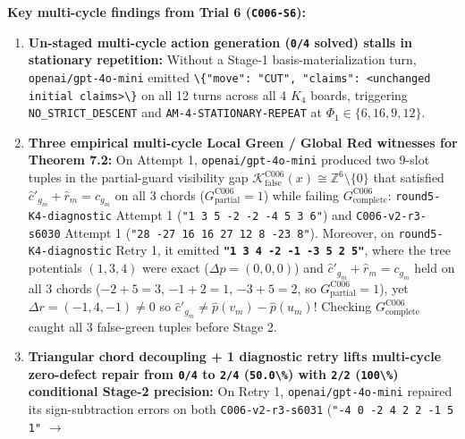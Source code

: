 \documentclass[
  11pt,
]{article}
\newcommand{\passthrough}[1]{#1}
\providecommand{\tightlist}{%
  \setlength{\itemsep}{0pt}\setlength{\parskip}{0pt}}
\begin{document}
\textbf{Key multi-cycle findings from Trial 6
(\passthrough{\lstinline!C006-S6!}):}

\begin{enumerate}
\def\labelenumi{\arabic{enumi}.}
\tightlist
\item
  \textbf{Un-staged multi-cycle action generation
  (\passthrough{\lstinline!0/4!} solved) stalls in stationary
  repetition:} Without a Stage-1 basis-materialization turn,
  \nolinkurl{openai/gpt-4o-mini} emitted
  \passthrough{\lstinline!\{"move": "CUT", "claims": <unchanged initial claims>\}!}
  on all 12 turns across all 4 \(K_4\) boards, triggering
  \nolinkurl{NO_STRICT_DESCENT} and \nolinkurl{AM-4-STATIONARY-REPEAT}
  at
  \(\Phi_1 \in \{6,\allowbreak  16,\allowbreak  9,\allowbreak  12\}\).
\item
  \textbf{Three empirical multi-cycle Local Green / Global Red witnesses
  for Theorem 7.2:} On Attempt 1, \nolinkurl{openai/gpt-4o-mini}
  produced two 9-slot tuples in the partial-guard visibility gap
  \(\mathcal{K}_{\text{false}}^{\text{C006}}(x) \cong \mathbb{Z}^6 \setminus \{0\}\)
  that satisfied \(\hat{c}'_{g_m} + \hat{r}_m = c_{g_m}\) on all 3
  chords (\(G_{\text{partial}}^{\text{C006}} = 1\)) while failing
  \(G_{\text{complete}}^{\text{C006}}\):
  \nolinkurl{round5-K4-diagnostic} Attempt 1
  (\passthrough{\lstinline!"1 3 5 -2 -2 -4 5 3 6"!}) and
  \nolinkurl{C006-v2-r3-s6030} Attempt 1
  (\passthrough{\lstinline!"28 -27 16 16 27 12 8 -23 8"!}). Moreover, on
  \nolinkurl{round5-K4-diagnostic} Retry 1, it emitted
  \textbf{\passthrough{\lstinline!"1 3 4 -2 -1 -3 5 2 5"!}}, where the
  tree potentials \((1,\allowbreak  3,\allowbreak  4)\) were exact
  (\(\Delta p = (0,\allowbreak  0,\allowbreak  0)\)) and
  \(\hat{c}'_{g_m} + \hat{r}_m = c_{g_m}\) held on all 3 chords
  (\(-2+5=3\), \(-1+2=1\), \(-3+5=2\), so
  \(G_{\text{partial}}^{\text{C006}} = 1\)), yet
  \(\Delta r = (-1,\allowbreak  4,\allowbreak  -1) \ne 0\) so
  \(\hat{c}'_{g_m} \ne \hat{p}(v_m) - \hat{p}(u_m)\)! Checking
  \(G_{\text{complete}}^{\text{C006}}\) caught all 3 false-green tuples
  before Stage 2.
\item
  \textbf{Triangular chord decoupling + 1 diagnostic retry lifts
  multi-cycle zero-defect repair from \passthrough{\lstinline!0/4!} to
  \passthrough{\lstinline!2/4!} (\passthrough{\lstinline!50.0\%!}) with
  \passthrough{\lstinline!2/2!} (\passthrough{\lstinline!100\%!})
  conditional Stage-2 precision:} On Retry 1,
  \nolinkurl{openai/gpt-4o-mini} repaired its sign-subtraction errors on
  both \nolinkurl{C006-v2-r3-s6031}
  (\passthrough{\lstinline!"-4 0 -2 4 2 2 -1 5 1"!} \(\to\)

\end{enumerate}
\end{document}
